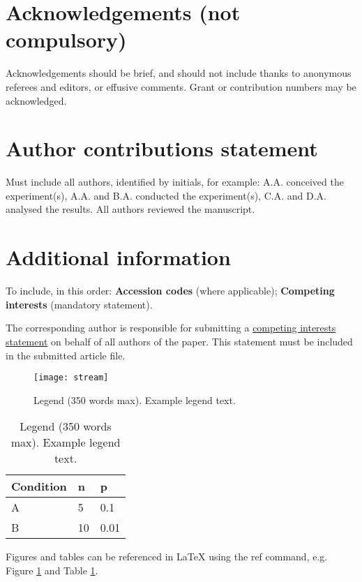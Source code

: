 \documentclass[fleqn,10pt]{wlscirep}
\begin{document}
\section*{Acknowledgements (not compulsory)}

Acknowledgements should be brief, and should not include thanks to anonymous referees and editors, or effusive comments. Grant or contribution numbers may be acknowledged.

\section*{Author contributions statement}

Must include all authors, identified by initials, for example:
A.A. conceived the experiment(s),  A.A. and B.A. conducted the experiment(s), C.A. and D.A. analysed the results.  All authors reviewed the manuscript. 

\section*{Additional information}

To include, in this order: \textbf{Accession codes} (where applicable); \textbf{Competing interests} (mandatory statement). 

The corresponding author is responsible for submitting a \href{http://www.nature.com/srep/policies/index.html#competing}{competing interests statement} on behalf of all authors of the paper. This statement must be included in the submitted article file.

\begin{figure}[ht]
\centering
\texttt{[image: stream]}
\caption{Legend (350 words max). Example legend text.}
\label{fig:stream}
\end{figure}

\begin{table}[ht]
\centering
\begin{tabular}{|l|l|l|}
\hline
Condition & n & p \\
\hline
A & 5 & 0.1 \\
\hline
B & 10 & 0.01 \\
\hline
\end{tabular}
\caption{\label{tab:example}Legend (350 words max). Example legend text.}
\end{table}

Figures and tables can be referenced in LaTeX using the ref command, e.g. Figure \ref{fig:stream} and Table \ref{tab:example}.
\end{document}

